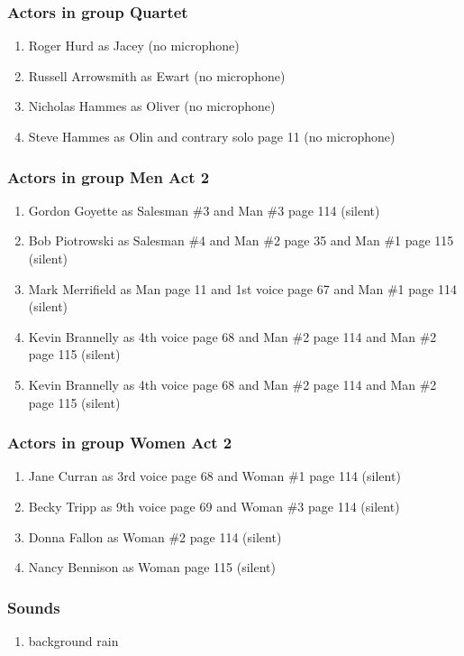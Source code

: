 \subsubsection{Actors in group Quartet}
\begin{enumerate}
\item Roger Hurd as Jacey (no microphone)
\item Russell Arrowsmith as Ewart (no microphone)
\item Nicholas Hammes as Oliver (no microphone)
\item Steve Hammes as Olin and contrary solo page 11 (no microphone)
\end{enumerate}
\subsubsection{Actors in group Men Act 2}
\begin{enumerate}
\item Gordon Goyette as Salesman \#3 and Man \#3 page 114 (silent)
\item Bob Piotrowski as Salesman \#4 and Man \#2 page 35 and Man \#1 page 115 (silent)
\item Mark Merrifield as Man page 11 and 1st voice page 67 and Man \#1 page 114 (silent)
\item Kevin Brannelly as 4th voice page 68 and Man \#2 page 114 and Man \#2 page 115 (silent)
\item Kevin Brannelly as 4th voice page 68 and Man \#2 page 114 and Man \#2 page 115 (silent)
\end{enumerate}
\subsubsection{Actors in group Women Act 2}
\begin{enumerate}
\item Jane Curran as 3rd voice page 68 and Woman \#1 page 114 (silent)
\item Becky Tripp as 9th voice page 69 and Woman \#3 page 114 (silent)
\item Donna Fallon as Woman \#2 page 114 (silent)
\item Nancy Bennison as Woman page 115 (silent)
\end{enumerate}

\subsubsection{Sounds}
\begin{enumerate}
\item background rain
\end{enumerate}
